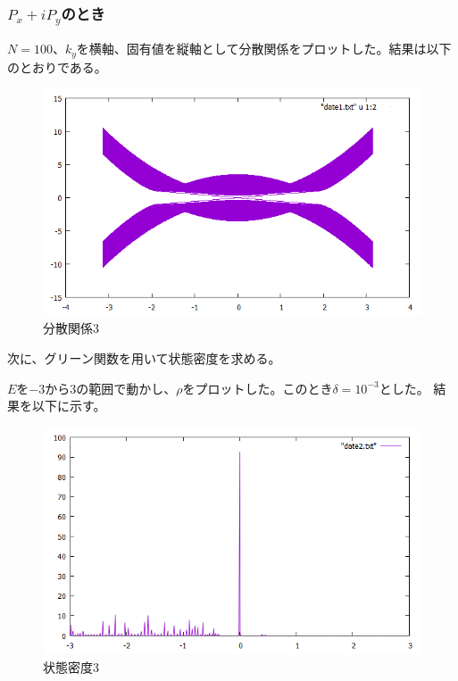 \documentclass{jsarticle}
\begin{document}
            \subsubsection{$P_x+iP_y$のとき}
            $N=100$、$k_y$を横軸、固有値を縦軸として分散関係をプロットした。結果は以下のとおりである。
    
            \begin{figure}[H]
                \centering
                \includegraphics[scale=0.5]{BdG3_bry.png}
                \caption{分散関係3}
                \label{Dispersion3}
            \end{figure}
    
            次に、グリーン関数を用いて状態密度を求める。
           
            $E$を$-3$から$3$の範囲で動かし、$\rho$をプロットした。このとき$\delta=10^{-3}$とした。
            結果を以下に示す。
    
            \begin{figure}[H]
                \centering
                \includegraphics[scale=0.5]{LDOS3_bry.png}
                \caption{状態密度3}
                \label{LDOS3}
            \end{figure}

    
\end{document}
